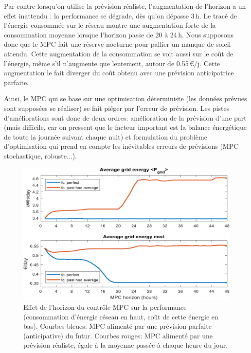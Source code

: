 \documentclass[a4paper,10pt,twocolumn]{article}
\begin{document}
Par contre lorsqu'on utilise la prévision réaliste, l'augmentation
de l'horizon a un effet inattendu : la performance se dégrade,
dès qu'on dépasse 3\,h. 
Le tracé de l'énergie consommée sur le réseau montre une augmentation forte de la consommation moyenne
lorsque l'horizon passe de 20 à 24\,h.
Nous supposons donc que le MPC fait une réserve nocturne pour pallier un manque
de soleil attendu.
Cette augmentation de la consommation se voit aussi sur le coût de l'énergie,
même s'il n'augmente que lentement, autour de 0.55\,€/j.
Cette augmentation le fait diverger du coût obtenu avec une prévision anticipatrice parfaite.

Ainsi, le MPC qui se base sur une optimisation déterministe
(les données prévues sont supposées se réaliser) se fait piéger
par l'erreur de prévision.
Les pistes d'améliorations sont donc de deux ordres:
amélioration de la prévision d'une part
(mais difficile, car on pressent que le facteur important est la balance énergétique
de toute la journée suivant chaque nuit)
et formulation du problème d'optimisation qui prend en compte les inévitables
erreurs de prévisions (MPC stochastique, robuste...).

\begin{figure}
        \begin{center}
                \includegraphics[width=1\columnwidth]{figures/MPC_horizon_effect.pdf}
        \end{center}

        \caption{Effet de l'horizon du contrôle MPC sur la performance
        (consommation d'énergie réseau en haut, coût de cette énergie en bas).
        Courbes bleues: MPC alimenté par une prévision parfaite (anticipative) du futur.
        Courbes rouges: MPC alimenté par une prévision réaliste, égale à la moyenne passée à chaque heure du jour. 
        }
        \label{fig:mpc_horiz}
\end{figure}
\end{document}
